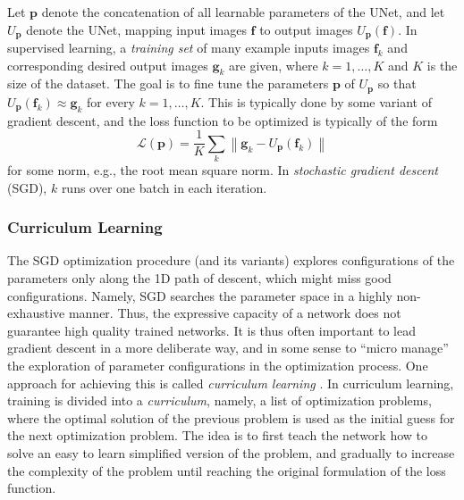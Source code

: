 \documentclass[10pt,a4paper]{article}
\begin{document}
Let $\mathbf{p}$ denote the concatenation of all learnable parameters of the UNet, and let $U_{\mathbf{p}}$ denote the UNet, mapping input images $\mathbf{f}$ to output images $U_{\mathbf{p}}(\mathbf{f})$.
%
In supervised learning, a \emph{training set} of many example inputs images  $\mathbf{f}_k$ and corresponding desired output images $\mathbf{g}_k$ are given, where $k=1,\ldots,K$ and $K$ is the size of the dataset. The goal is to fine tune the parameters $\mathbf{p}$ of $U_{\mathbf{p}}$ so that $U_{\mathbf{p}}(\mathbf{f}_k) \approx \mathbf{g}_k$ for every $k=1,\ldots,K$. 
%
This is typically done by some variant of gradient descent, and the loss function to be optimized is typically of the form 
\begin{equation} 
\mathcal{L}(\mathbf{p})=\frac{1}{K}\sum_{k}\left\| \mathbf{g}_k - U_{\mathbf{p}}(\mathbf{f}_k) \right\|
\end{equation}
for some norm, e.g., the root mean square norm. In \emph{stochastic gradient descent} (SGD), $k$ runs over one batch in each iteration. 

\subsubsection{Curriculum Learning}

The SGD optimization procedure (and its variants) explores configurations of the parameters only along the 1D path of descent, which might miss good configurations.  Namely, SGD searches the parameter space in a highly non-exhaustive manner. 
Thus, the expressive capacity of a network does not guarantee high quality trained networks. %
It is thus often important to lead gradient descent in a more deliberate way, and in some sense to ``micro manage'' the exploration of parameter configurations in the optimization process. One approach for achieving this is called \emph{curriculum learning} \cite{Bengio_cur}. In curriculum learning, training is divided into a \emph{curriculum}, namely, a list of optimization problems, where the optimal solution of the previous problem is used as the initial guess for the next optimization problem. The idea is to first teach the network how to solve an easy to learn simplified version of the problem, and gradually to increase the complexity of the problem until reaching the original formulation of the loss function.
\end{document}
